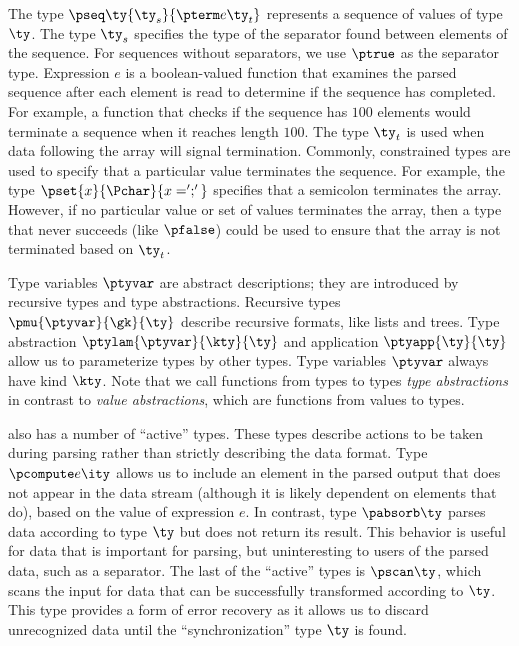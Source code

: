 The type $\pseq \ty {\ty_s} {\pterm e {\ty_t}}$ represents a sequence
of values of type $\ty$. The type $\ty_s$ specifies the type of the
separator found between elements of the sequence. For sequences
without separators, we use $\ptrue$ as the separator type.  Expression
$e$ is a boolean-valued function that examines the parsed sequence
after each element is read to determine if the sequence has completed.
For example, a function that checks if the sequence has $100$ elements
would terminate a sequence when it reaches length $100$.  The type
$\ty_t$ is used when data following the array will signal termination.
Commonly, constrained types are used to specify that a particular
value terminates the sequence.  For example, the type
$\pset{x}{\Pchar}{x = ';'}$ specifies that a semicolon terminates the
array. However, if no particular value or set of values terminates the
array, then a type that never succeeds (like $\pfalse$) could be used
to ensure that the array is not terminated based on $\ty_t$.

Type variables $\ptyvar$ are abstract descriptions; they are
introduced by recursive types and type abstractions. Recursive types
$\pmu{\ptyvar}{\gk}{\ty}$ describe recursive formats, like lists and
trees. Type abstraction $\ptylam{\ptyvar}{\kty}{\ty}$ and application
$\ptyapp{\ty}{\ty}$ allow us to parameterize types by other types.
Type variables $\ptyvar$ always have kind $\kty$. Note that we call
functions from types to types {\em type abstractions} in contrast to
{\em value abstractions}, which are functions from values to types.

\ddc{} also has a number of ``active'' types.  These types describe
actions to be taken during parsing rather than strictly describing the
data format. Type $\pcompute e \ity$ allows us to include an element
in the parsed output that does not appear in the data stream (although
it is likely dependent on elements that do), based on the value of
expression $e$.  In contrast, type $\pabsorb \ty$ parses data
according to type $\ty$ but does not return its result. This behavior
is useful for data that is important for parsing, but uninteresting to
users of the parsed data, such as a separator. The last of the
``active'' types is $\pscan \ty$, which scans the input for data that
can be successfully transformed according to $\ty$. This type provides
a form of error recovery as it allows us to discard unrecognized data
until the ``synchronization'' type $\ty$ is found.

